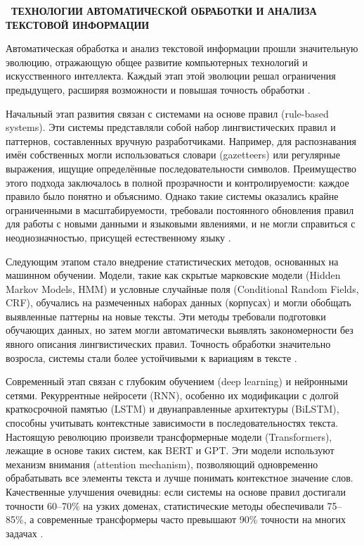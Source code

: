 \documentclass{SibFU-docs}
\begin{document}
\newpage
{}
\begin{center}\textbf{\thesection\ ТЕХНОЛОГИИ АВТОМАТИЧЕСКОЙ ОБРАБОТКИ И АНАЛИЗА ТЕКСТОВОЙ ИНФОРМАЦИИ}\end{center}
\vspace*{-1.5em}


Автоматическая обработка и анализ текстовой информации прошли значительную эволюцию, отражающую общее развитие компьютерных технологий и искусственного интеллекта. Каждый этап этой эволюции решал ограничения предыдущего, расширяя возможности и повышая точность обработки \cite{Lumenalta2025NLP, Coursera2025NLP}.

Начальный этап развития связан с системами на основе правил (rule-based systems). Эти системы представляли собой набор лингвистических правил и паттернов, составленных вручную разработчиками. Например, для распознавания имён собственных могли использоваться словари (gazetteers) или регулярные выражения, ищущие определённые последовательности символов. Преимущество этого подхода заключалось в полной прозрачности и контролируемости: каждое правило было понятно и объяснимо. Однако такие системы оказались крайне ограниченными в масштабируемости, требовали постоянного обновления правил для работы с новыми данными и языковыми явлениями, и не могли справиться с неоднозначностью, присущей естественному языку \cite{CEDAR2012IE}.

Следующим этапом стало внедрение статистических методов, основанных на машинном обучении. Модели, такие как скрытые марковские модели (Hidden Markov Models, HMM) и условные случайные поля (Conditional Random Fields, CRF), обучались на размеченных наборах данных (корпусах) и могли обобщать выявленные паттерны на новые тексты. Эти методы требовали подготовки обучающих данных, но затем могли автоматически выявлять закономерности без явного описания лингвистических правил. Точность обработки значительно возросла, системы стали более устойчивыми к вариациям в тексте \cite{GeeksforGeeks2024NER}.

Современный этап связан с глубоким обучением (deep learning) и нейронными сетями. Рекуррентные нейросети (RNN), особенно их модификации с долгой краткосрочной памятью (LSTM) и двунаправленные архитектуры (BiLSTM), способны учитывать контекстные зависимости в последовательностях текста. Настоящую революцию произвели трансформерные модели (Transformers), лежащие в основе таких систем, как BERT и GPT. Эти модели используют механизм внимания (attention mechanism), позволяющий одновременно обрабатывать все элементы текста и лучше понимать контекстное значение слов. Качественные улучшения очевидны: если системы на основе правил достигали точности 60–70\% на узких доменах, статистические методы обеспечивали 75–85\%, а современные трансформеры часто превышают 90\% точности на многих задачах \cite{DisplayR2025TextAnalysis, Lumenalta2025Tools}.
\end{document}
